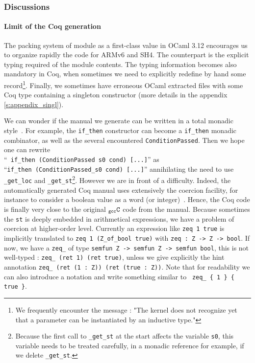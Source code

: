 \documentclass[a4paper, 11pt]{article}
\newcommand{\ocaml}{OCaml 3.12\xspace}
\newcommand{\gccC}{$_{\tt gcc}{\tt C}$\xspace}
\begin{document}
\subsubsection{Discussions}

\paragraph{Limit of the Coq generation}
The packing system of module as a first-class value in \ocaml encourages us to organize rapidly the code for ARMv6 and SH4. The counterpart is the explicit typing required of the module contents. The typing information becomes also mandatory in Coq, when sometimes we need to explicitly redefine by hand some record\footnote{We frequently encounter the message : "The kernel does not recognize yet that a parameter can be instantiated by an inductive type."}. Finally, we sometimes have erroneous OCaml extracted files with some Coq type containing a singleton constructor (more details in the appendix \ref{s:appendix_singl}).

\hspace{1ex}

We can wonder if the manual we generate can be written in a total monadic style~\cite{conf/itp/FoxM10}. For example, the \verb|if_then| constructor can become a \verb|if_then| monadic combinator, as well as the several encountered \verb|ConditionPassed|. Then we hope one can rewrite \\
``{\tt <s0> if\_then (ConditionPassed s0 cond) [...]}'' as \\
 ``{\tt if\_then (ConditionPassed\_s0 cond) [...]}'' annihilating the need to use \verb|_get_loc| and \verb|_get_st|\footnote{Because the first call to {\tt \_get\_st} at the start affects the variable {\tt s0}, this variable needs to be treated carefully, in a monadic reference for example, if we delete {\tt \_get\_st}.}. However we are in front of a difficulty. Indeed, the automatically generated Coq manual uses extensively the coercion facility, for instance to consider a boolean value as a word (or integer)~\cite{arm}. Hence, the Coq code is finally very close to the original \gccC code from the manual. Because sometimes the \verb|st| is deeply embedded in arithmetical expressions, we 
have a problem of coercion at higher-order level. Currently an
expression like
\verb|zeq 1 true| is implicitly translated to \verb|zeq 1 (Z_of_bool true)|
with \verb|zeq : Z -> Z -> bool|.
If now, we have a \verb|zeq_| of type \verb|semfun Z -> semfun Z -> semfun bool|,
this is not well-typed :
\verb|zeq_ (ret 1) (ret true)|,
unless we give explicitly the hint annotation
\verb|zeq_ (ret (1 : Z)) (ret (true : Z))|.
Note that for readability we can also introduce a notation and write
something similar to \verb| zeq_ { 1 } { true }|.
\end{document}
